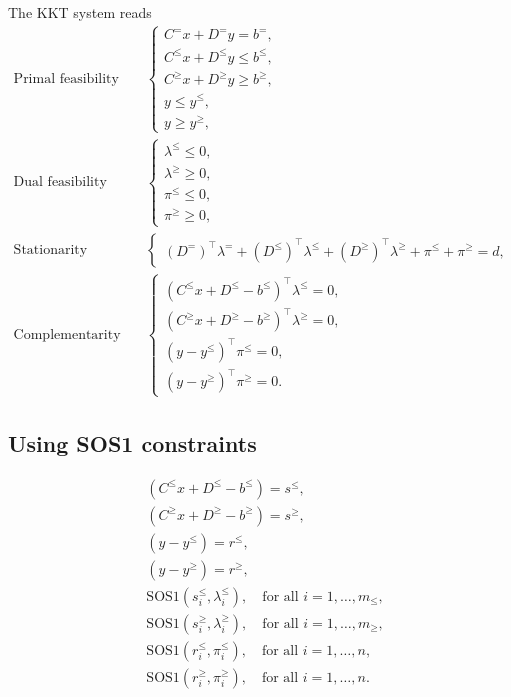 The KKT system reads
\begin{align*}
    \text{Primal feasibility} \quad & 
    \begin{cases}
        C^=x + D^=y = b^=, \\
        C^\le x + D^\le y \le b^\le, \\
        C^\ge x + D^\ge y \ge b^\ge, \\
        y \le y^\le, \\
        y \ge y^\ge,
    \end{cases} \\
    \text{Dual feasibility} \quad & 
    \begin{cases}
        \lambda^\le \le 0, \\
        \lambda^\ge \ge 0, \\
        \pi^\le \le 0, \\
        \pi^\ge \ge 0, 
    \end{cases} \\
    \text{Stationarity} \quad &
    \begin{cases}
        (D^=)^\top\lambda^= + (D^\le)^\top\lambda^\le + (D^\ge)^\top\lambda^\ge + \pi^\le + \pi^\ge = d,
    \end{cases} \\
    \text{Complementarity} \quad & 
    \begin{cases}
        (C^\le x + D^\le - b^\le)^\top \lambda^\le = 0, \\
        (C^\ge x + D^\ge - b^\ge)^\top \lambda^\ge = 0, \\
        (y - y^\le)^\top \pi^\le = 0, \\
        (y - y^\ge)^\top \pi^\ge = 0.
    \end{cases}
\end{align*}

\subsection{Using SOS1 constraints}

\begin{align*}
    & (C^\le x + D^\le - b^\le) = s^\le, \\
    & (C^\ge x + D^\ge - b^\ge) = s^\ge, \\
    & (y - y^\le) = r^\le, \\
    & (y - y^\ge) = r^\ge, \\
    & \mathrm{SOS1}(s_i^\le, \lambda^\le_i), \quad \text{for all } i=1,\dotsc,m_\le, \\
    & \mathrm{SOS1}(s_i^\ge, \lambda^\ge_i), \quad \text{for all } i=1,\dotsc,m_\ge, \\
    & \mathrm{SOS1}(r_i^\le, \pi^\le_i), \quad \text{for all } i=1,\dotsc,n, \\
    & \mathrm{SOS1}(r_i^\ge, \pi^\ge_i), \quad \text{for all } i=1,\dotsc,n. 
\end{align*}

